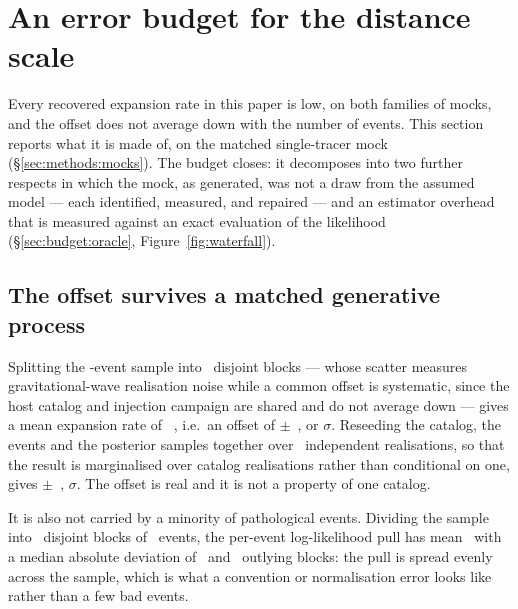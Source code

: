 \section{An error budget for the distance scale}
\label{sec:budget}

Every recovered expansion rate in this paper is low, on both families of mocks,
and the offset does not average down with the number of events. This section
reports what it is made of, on the matched single-tracer mock
(\S\ref{sec:methods:mocks}). The budget closes: it decomposes into two further
respects in which the mock, as generated, was not a draw from the assumed model
--- each identified, measured, and repaired --- and an estimator overhead that
is measured against an exact evaluation of the likelihood
(\S\ref{sec:budget:oracle}, Figure~\ref{fig:waterfall}).

\subsection{The offset survives a matched generative process}
\label{sec:budget:closure}

Splitting the \CloNobs-event sample into \CloBlockN\ disjoint blocks --- whose
scatter measures gravitational-wave realisation noise while a common offset is
systematic, since the host catalog and injection campaign are shared and do not
average down --- gives a mean expansion rate of \CloBlockMeanHzero~\kmsmpc, i.e.\
an offset of \CloBlockOffset$\pm$\CloBlockSem~\kmsmpc, or
\CloBlockSig$\sigma$. Reseeding the catalog, the events and the posterior
samples together over \CloSeedN\ independent realisations, so that the result is
marginalised over catalog realisations rather than conditional on one, gives
\CloSeedOffset$\pm$\CloSeedSem~\kmsmpc, \CloSeedSig$\sigma$. The offset is real
and it is not a property of one catalog.

It is also not carried by a minority of pathological events. Dividing the sample
into \CloLocNBlocks\ disjoint blocks of \CloLocBlockSize\ events, the per-event
log-likelihood pull has mean \CloLocPullMean\ with a median absolute deviation of
\CloLocPullMad\ and \CloLocOutliers\ outlying blocks: the pull is spread evenly
across the sample, which is what a convention or normalisation error looks like
rather than a few bad events.

